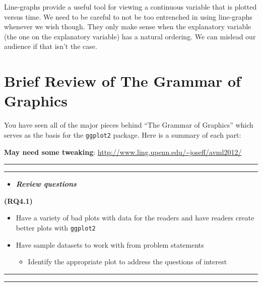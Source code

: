 \documentclass[]{tufte-book}
\providecommand{\tightlist}{%
  \setlength{\itemsep}{0pt}\setlength{\parskip}{0pt}}
\newenvironment{rmdblock}[1]
  {\begin{shaded*}
  \begin{itemize}
  \renewcommand{\labelitemi}{
    \raisebox{-.7\height}[0pt][0pt]{
    }
  }
  \item
  }
  {
  \end{itemize}
  \end{shaded*}
  }
\newenvironment{review}
  {\begin{rmdblock}{warning}}
  {\end{rmdblock}}
\begin{document}
Line-graphs provide a useful tool for viewing a continuous variable that
is plotted versus time. We need to be careful to not be too entrenched
in using line-graphs whenever we wish though. They only make sense when
the explanatory variable (the one on the explanatory variable) has a
natural ordering. We can mislead our audience if that isn't the case.

\section{Brief Review of The Grammar of
Graphics}\label{brief-review-of-the-grammar-of-graphics}

You have seen all of the major pieces behind ``The Grammar of Graphics''
which serves as the basis for the \texttt{ggplot2} package. Here is a
summary of each part:

\textbf{May need some tweaking}:
\url{http://www.ling.upenn.edu/~joseff/avml2012/}

\begin{center}\rule{0.5\linewidth}{\linethickness}\end{center}

\begin{center}\rule{0.5\linewidth}{\linethickness}\end{center}

\begin{review}
\textbf{\emph{Review questions}}
\end{review}

\textbf{(RQ4.1)}

\begin{itemize}
\item
  Have a variety of bad plots with data for the readers and have readers
  create better plots with \texttt{ggplot2}
\item
  Have sample datasets to work with from problem statements

  \begin{itemize}
  \tightlist
  \item
    Identify the appropriate plot to address the questions of interest
  \end{itemize}
\end{itemize}

\begin{center}\rule{0.5\linewidth}{\linethickness}\end{center}

\begin{center}\rule{0.5\linewidth}{\linethickness}\end{center}
\end{document}
